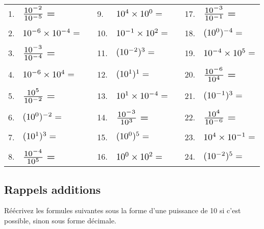 \documentclass[11pt,a4paper]{article}
\begin{document}
\begin{tabular}{ l l  C{1.75cm}  l l  C{1.75cm}  l l }
1. & $ \Scale[1.5]{ \frac{10^{-2}}{10^{-5}} = } $ & &  9. & $ \Scale[1.25]{ 10^{4} \times 10^{0} = } $  & & 17. & $ \Scale[1.5]{ \frac{10^{-3}}{10^{-1}} = } $ \\
 & & & & & & & \\
2. & $ \Scale[1.25]{ 10^{-6} \times 10^{-4} = } $ & & 10. & $ \Scale[1.25]{ 10^{-1} \times 10^{2} = } $ & & 18. & $ \Scale[1.25]{ (10^{0})^{-4} = } $ \\
 & & & & & & & \\
3. & $ \Scale[1.5]{ \frac{10^{-3}}{10^{-4}} = } $ & & 11. & $ \Scale[1.25]{ (10^{-2})^{3} = } $         & & 19. & $ \Scale[1.25]{ 10^{-4} \times 10^{5} = } $ \\
 & & & & & & & \\
4. & $ \Scale[1.25]{ 10^{-6} \times 10^{4} = } $  & & 12. & $ \Scale[1.25]{ (10^{1})^{1} = } $          & & 20. & $ \Scale[1.5]{ \frac{10^{-6}}{10^{4}} = } $ \\
 & & & & & & & \\
5. & $ \Scale[1.5]{ \frac{10^{5}}{10^{-2}} = } $  & & 13. & $ \Scale[1.25]{ 10^{1} \times 10^{-4} = } $ & & 21. & $ \Scale[1.25]{ (10^{-1})^{3} = } $ \\
 & & & & & & & \\
6. & $ \Scale[1.25]{ (10^{0})^{-2} = } $          & & 14. & $ \Scale[1.5]{ \frac{10^{-3}}{10^{3}} = } $ & & 22. & $ \Scale[1.5]{ \frac{10^{4}}{10^{-6}} = } $ \\
 & & & & & & & \\
7. & $ \Scale[1.25]{ (10^{1})^{3} = } $           & & 15. & $ \Scale[1.25]{ (10^{0})^{5} = } $          & & 23. & $ \Scale[1.25]{ 10^{4} \times 10^{-1} = } $ \\
 & & & & & & & \\
8. & $ \Scale[1.5]{ \frac{10^{-4}}{10^{5}} = } $  & & 16. & $ \Scale[1.25]{ 10^{0} \times 10^{2} = } $  & & 24. & $ \Scale[1.25]{ (10^{-2})^{5} = } $ \\
\end{tabular}

\bigskip


\subsection{Rappels additions}

\medskip

Réécrivez les formules suivantes sous la forme d'une puissance de 10 si c'est possible, sinon sous forme décimale.
\end{document}
